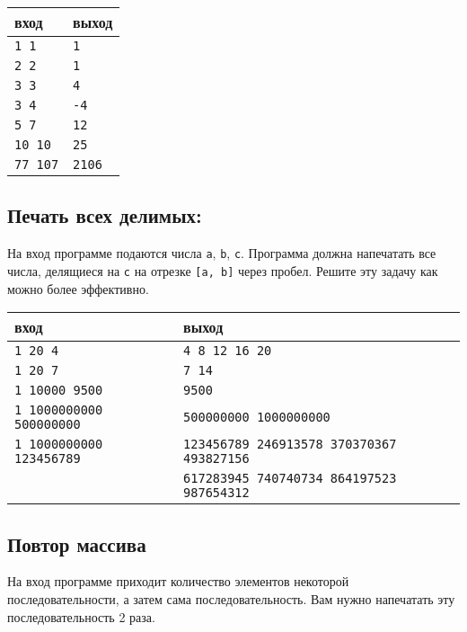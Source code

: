 \documentclass{article}
\begin{document}
\begin{center}
\begin{tabular}{ l l }
 вход & выход \\ \hline
 \texttt{1 1}  & \texttt{1}  \\ 
 \texttt{2 2} & \texttt{1}  \\ 
 \texttt{3 3} & \texttt{4}  \\ 
 \texttt{3 4} & \texttt{-4}  \\  
 \texttt{5 7} & \texttt{12}  \\  
 \texttt{10 10} & \texttt{25}  \\  
 \texttt{77 107} & \texttt{2106}  \\ 
\end{tabular}
\end{center}


\subsection{Печать всех делимых:}
На вход программе подаются числа \texttt{a}, \texttt{b}, \texttt{c}. Программа должна напечатать все числа, делящиеся на \texttt{c} на отрезке \texttt{[a, b]} через пробел. Решите эту задачу как можно более эффективно.

\begin{center}
\begin{tabular}{ l l }
 вход & выход \\ \hline
 \texttt{1 20 4}  & \texttt{4 8 12 16 20}  \\ 
 \texttt{1 20 7} &  \texttt{7 14}  \\ 
 \texttt{1 10000 9500} & \texttt{9500}  \\ 
 \texttt{1 1000000000 500000000} & \texttt{500000000 1000000000} \\
 \texttt{1 1000000000 123456789} & \texttt{123456789 246913578 370370367 493827156}  \\ 
                                 & \texttt{617283945 740740734 864197523 987654312}  \\   
\end{tabular}
\end{center}


\subsection{Повтор массива}
На вход программе приходит количество элементов некоторой последовательности, а затем сама последовательность. Вам нужно напечатать эту последовательность 2 раза.
\end{document}
